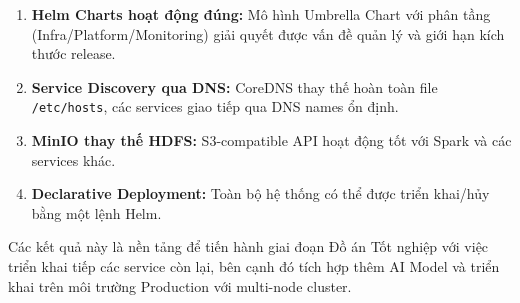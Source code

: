 \begin{enumerate}
    \item \textbf{Helm Charts hoạt động đúng:} Mô hình Umbrella Chart với phân tầng (Infra/Platform/Monitoring) giải quyết được vấn đề quản lý và giới hạn kích thước release.

    \item \textbf{Service Discovery qua DNS:} CoreDNS thay thế hoàn toàn file \texttt{/etc/hosts}, các services giao tiếp qua DNS names ổn định.

    \item \textbf{MinIO thay thế HDFS:} S3-compatible API hoạt động tốt với Spark và các services khác.

    \item \textbf{Declarative Deployment:} Toàn bộ hệ thống có thể được triển khai/hủy bằng một lệnh Helm.
\end{enumerate}

Các kết quả này là nền tảng để tiến hành giai đoạn Đồ án Tốt nghiệp với việc triển khai tiếp các service còn lại, bên cạnh đó tích hợp thêm AI Model và triển khai trên môi trường Production với multi-node cluster.
